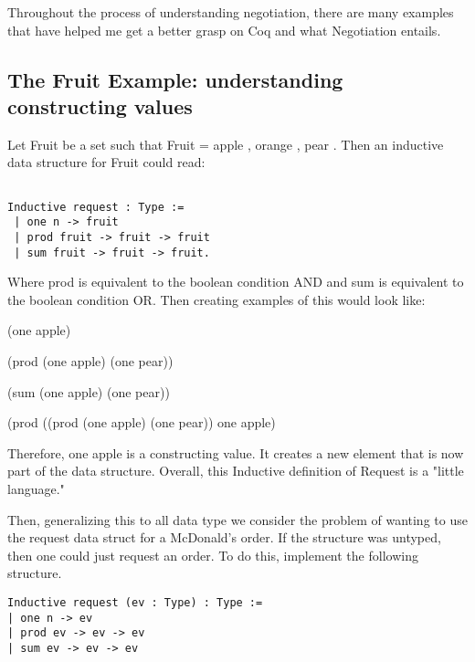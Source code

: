 \documentclass[10pt]{article}
\begin{document}
Throughout the process of understanding negotiation, there are many examples that have helped me get a better grasp on Coq and what Negotiation entails. 

\subsection {The Fruit Example: understanding constructing values}

Let Fruit be a set such that Fruit = { apple , orange , pear }. Then an inductive data structure for Fruit could read:  

\begin{verbatim}

Inductive request : Type := 
 | one n -> fruit
 | prod fruit -> fruit -> fruit
 | sum fruit -> fruit -> fruit.
\end{verbatim}

Where prod is equivalent to the boolean condition AND and sum is equivalent to the boolean condition OR. Then creating examples of this would look like: 


(one apple)

(prod (one apple) (one pear))

(sum (one apple) (one pear))

(prod ((prod (one apple) (one pear)) one apple)


Therefore, one apple is a constructing value. It creates a new element that is now part of the data structure. Overall, this Inductive definition of Request is a "little language."

Then, generalizing this to all data type we consider the problem of wanting to use the request data struct for a McDonald's order. If the structure was untyped, then one could just request an order. To do this, implement the following structure. 

\begin{verbatim}
Inductive request (ev : Type) : Type :=
| one n -> ev
| prod ev -> ev -> ev
| sum ev -> ev -> ev

\end{verbatim}
\end{document}
